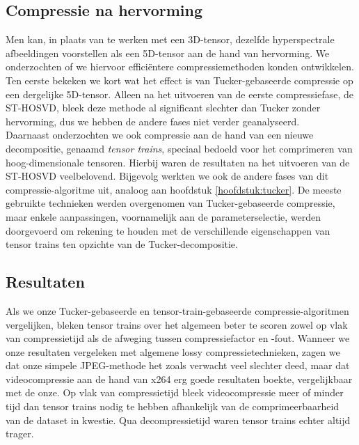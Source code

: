 \newpage
\subsection{Compressie na hervorming}

Men kan, in plaats van te werken met een 3D-tensor, dezelfde hyperspectrale afbeeldingen voorstellen als een 5D-tensor aan de hand van hervorming. We onderzochten of we hiervoor effici\"entere compressiemethoden konden ontwikkelen.\\

Ten eerste bekeken we kort wat het effect is van Tucker-gebaseerde compressie op een dergelijke 5D-tensor. Alleen na het uitvoeren van de eerste compressiefase, de ST-HOSVD, bleek deze methode al significant slechter dan Tucker zonder hervorming, dus we hebben de andere fases niet verder geanalyseerd.\\

Daarnaast onderzochten we ook compressie aan de hand van een nieuwe decompositie, genaamd \textit{tensor trains}, speciaal bedoeld voor het comprimeren van hoog-dimensionale tensoren. Hierbij waren de resultaten na het uitvoeren van de ST-HOSVD veelbelovend. Bijgevolg werkten we ook de andere fases van dit compressie-algoritme uit, analoog aan hoofdstuk \ref{hoofdstuk:tucker}. De meeste gebruikte technieken werden overgenomen van Tucker-gebaseerde compressie, maar enkele aanpassingen, voornamelijk aan de parameterselectie, werden doorgevoerd om rekening te houden met de verschillende eigenschappen van tensor trains ten opzichte van de Tucker-decompositie.

\subsection{Resultaten}

Als we onze Tucker-gebaseerde en tensor-train-gebaseerde compressie-algoritmen vergelijken, bleken tensor trains over het algemeen beter te scoren zowel op vlak van compressietijd als de afweging tussen compressiefactor en -fout. Wanneer we onze resultaten vergeleken met algemene lossy compressietechnieken, zagen we dat onze simpele JPEG-methode het zoals verwacht veel slechter deed, maar dat videocompressie aan de hand van x264 \cite{ref:x264} erg goede resultaten boekte, vergelijkbaar met de onze. Op vlak van compressietijd bleek videocompressie meer of minder tijd dan tensor trains nodig te hebben afhankelijk van de comprimeerbaarheid van de dataset in kwestie. Qua decompressietijd waren tensor trains echter altijd trager.\\

